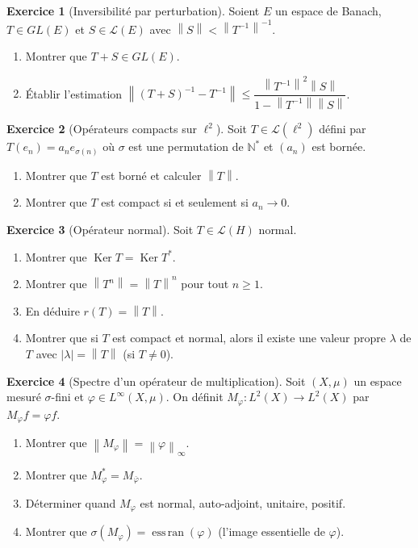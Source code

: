 \documentclass[a4paper,12pt]{book}
\DeclareMathOperator{\Ker}{Ker}
\newcommand{\N}{\mathbb{N}}
\newcommand{\norm}[1]{\left\| #1 \right\|}
\newcommand{\abs}[1]{\left| #1 \right|}
\theoremstyle{definition}
\newtheorem{exercice}{Exercice}[chapter]
\theoremstyle{plain}
\theoremstyle{remark}
\begin{document}
\begin{exercice}[Inversibilité par perturbation]\label{exo:perturbation}
Soient $E$ un espace de Banach, $T \in GL(E)$ et $S \in \mathcal{L}(E)$ avec
$\norm{S} < \norm{T^{-1}}^{-1}$.
\begin{enumerate}[label=(\alph*)]
    \item Montrer que $T + S \in GL(E)$.
    \item Établir l'estimation $\norm{(T+S)^{-1} - T^{-1}} \leq
          \dfrac{\norm{T^{-1}}^2 \norm{S}}{1 - \norm{T^{-1}}\norm{S}}$.
\end{enumerate}
\end{exercice}

\begin{exercice}[Opérateurs compacts sur $\ell^2$]\label{exo:compact-l2}
Soit $T \in \mathcal{L}(\ell^2)$ défini par $T(e_n) = a_n e_{\sigma(n)}$ où $\sigma$
est une permutation de $\N^*$ et $(a_n)$ est bornée.
\begin{enumerate}[label=(\alph*)]
    \item Montrer que $T$ est borné et calculer $\norm{T}$.
    \item Montrer que $T$ est compact si et seulement si $a_n \to 0$.
\end{enumerate}
\end{exercice}

\begin{exercice}[Opérateur normal]\label{exo:normal}
Soit $T \in \mathcal{L}(H)$ normal.
\begin{enumerate}[label=(\alph*)]
    \item Montrer que $\Ker T = \Ker T^*$.
    \item Montrer que $\norm{T^n} = \norm{T}^n$ pour tout $n \geq 1$.
    \item En déduire $r(T) = \norm{T}$.
    \item Montrer que si $T$ est compact et normal, alors il existe une valeur propre
          $\lambda$ de $T$ avec $\abs{\lambda} = \norm{T}$ (si $T \neq 0$).
\end{enumerate}
\end{exercice}

\begin{exercice}[Spectre d'un opérateur de multiplication]\label{exo:multiplication}
Soit $(X, \mu)$ un espace mesuré $\sigma$-fini et $\varphi \in L^\infty(X, \mu)$.
On définit $M_\varphi : L^2(X) \to L^2(X)$ par $M_\varphi f = \varphi f$.
\begin{enumerate}[label=(\alph*)]
    \item Montrer que $\norm{M_\varphi} = \norm{\varphi}_\infty$.
    \item Montrer que $M_\varphi^* = M_{\bar{\varphi}}$.
    \item Déterminer quand $M_\varphi$ est normal, auto-adjoint, unitaire, positif.
    \item Montrer que $\sigma(M_\varphi) = \operatorname{ess\,ran}(\varphi)$
          (l'image essentielle de $\varphi$).
\end{enumerate}
\end{exercice}
\end{document}
